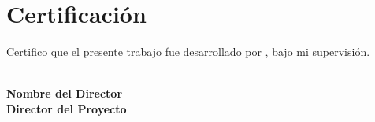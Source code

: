 \chapter*{Certificación}

Certifico que el presente trabajo fue desarrollado por \theauthor, bajo mi
supervisión.

\vspace{1.5cm}

\begin{flushright}
  \makebox[5cm]{\hrulefill} \\
  \textbf{Nombre del Director} \\
  \textbf{Director del Proyecto}
\end{flushright}
